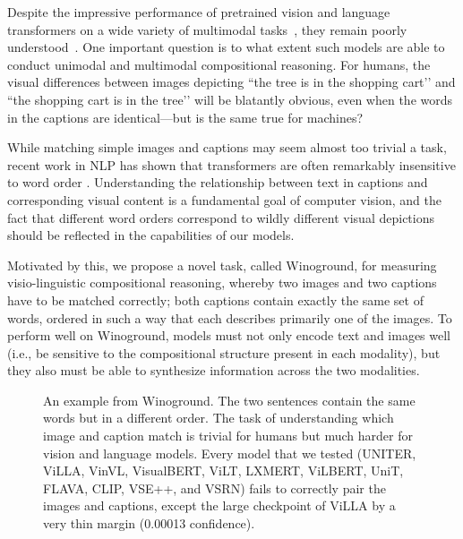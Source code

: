 \documentclass[10pt,twocolumn,letterpaper]{article}
\begin{document}
Despite the impressive performance of pretrained vision and language transformers on a wide variety of multimodal tasks~\cite{lu2019vilbert, li2019visualbert, radford2021clip}, they remain poorly understood~\cite{dou2021empirical,cao2020behind,li2020closer,singh2020we}. One important question is to what extent such models are able to conduct unimodal and multimodal compositional reasoning. For humans, the visual differences between images depicting ``the tree is in the shopping cart’’ and ``the shopping cart is in the tree’’ will be blatantly obvious, even when the words in the captions are identical---but is the same true for machines?

While matching simple images and captions may seem almost too trivial a task, recent work in NLP has shown that transformers are often remarkably insensitive to word order \cite{sinha2021matterslittle}. Understanding the relationship between text in captions and corresponding visual content is a fundamental goal of computer vision, and the fact that different word orders correspond to wildly different visual depictions should be reflected in the capabilities of our models.

Motivated by this, we propose a novel task, called Winoground, for measuring visio-linguistic compositional reasoning, 
whereby two images and two captions have to be matched correctly; both captions contain exactly the same set of words, ordered in such a way that each describes primarily one of the images. To perform well on Winoground, models must not only encode text and images well (i.e., be sensitive to the compositional structure present in each modality), but they also must be able to synthesize information across the two modalities.

\begin{figure}[!t]\centering
    \qquad
    \caption{An example from Winoground. The two sentences contain the same words but in a different order. The task of understanding which image and caption match is trivial for humans but much harder for vision and language models. Every model that we tested (UNITER, ViLLA, VinVL, VisualBERT, ViLT, LXMERT, ViLBERT, UniT, FLAVA, CLIP, VSE++, and VSRN) fails to correctly pair the images and captions, except the large checkpoint of ViLLA by a very thin margin (0.00013 confidence).}\label{fig:teaser-ex}\end{figure}
\end{document}

